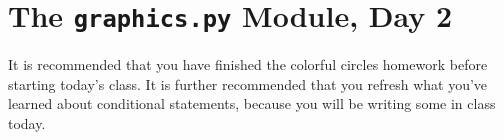 
\chapter{The \texttt{graphics.py} Module, Day 2}
\label{day:graphics2}


It is recommended that you have finished the colorful circles homework before starting today's class.  It is further recommended that you refresh what you've learned about conditional statements, because you will be writing some in class today.